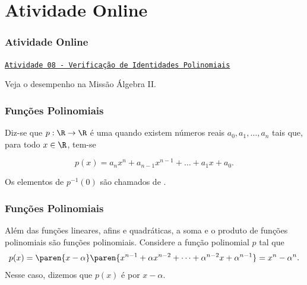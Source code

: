 \documentclass[10pt]{beamer}
\begin{document}
\section{Atividade Online}
\begin{frame}
\frametitle{Atividade Online} 

\href{https://pt.khanacademy.org/math/algebra2/polynomial-functions/proving-polynomial-identities/e/polynomial-identities}
{{\tt Atividade 08 - Verificação de Identidades Polinomiais}}



Veja o desempenho na Missão Álgebra II.


\end{frame}


\begin{frame}
\frametitle{Funções Polinomiais} 

\begin{definicao}
Diz-se que $p: \R \to \R$ é uma  quando
existem números reais $a_0, a_1, \dots , a_n$ tais que, para todo $x
\in \R$, tem-se

\begin{equation}\label{funcpol}
p(x) = a_n x^n + a_{n-1} x^{n-1} + \dots + a_1 x + a_0.
\end{equation}

Os elementos de $p^{-1}(0)$ são chamados de .
\end{definicao}

\end{frame}




\begin{frame}
\frametitle{Funções Polinomiais} 

\begin{exemplo}
Além das funções lineares, afins e quadráticas, a soma e o produto
de funções polinomiais são funções polinomiais. Considere a função
polinomial $p$ tal que $$p(x) = \paren{x - \alpha} \paren{x^{n-1} +
\alpha x^{n-2} + \dots + \alpha^{n-2}x+ \alpha^{n-1}}=x^n -
\alpha^n.$$ Nesse caso, dizemos que $p(x)$ é  por $x-
\alpha$.
\end{exemplo}

\end{frame}
\end{document}
